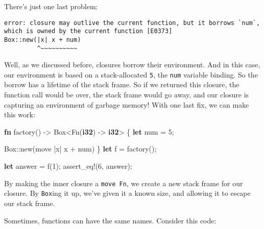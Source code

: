 \documentclass[a4paper,]{book}
\newenvironment{Shaded}{\begin{snugshade}}{\end{snugshade}}
\newcommand{\KeywordTok}[1]{\textcolor[rgb]{0.13,0.29,0.53}{\textbf{{#1}}}}
\newcommand{\DecValTok}[1]{\textcolor[rgb]{0.00,0.00,0.81}{{#1}}}
\newcommand{\OtherTok}[1]{\textcolor[rgb]{0.56,0.35,0.01}{{#1}}}
\newcommand{\NormalTok}[1]{{#1}}
\begin{document}
There's just one last problem:

\begin{verbatim}
error: closure may outlive the current function, but it borrows `num`,
which is owned by the current function [E0373]
Box::new(|x| x + num)
         ^~~~~~~~~~~
\end{verbatim}

Well, as we discussed before, closures borrow their environment. And in
this case, our environment is based on a stack-allocated \texttt{5}, the
\texttt{num} variable binding. So the borrow has a lifetime of the stack
frame. So if we returned this closure, the function call would be over,
the stack frame would go away, and our closure is capturing an
environment of garbage memory! With one last fix, we can make this work:

\begin{Shaded}
\begin{Highlighting}[]
\KeywordTok{fn} \NormalTok{factory() -> Box<Fn(}\KeywordTok{i32}\NormalTok{) -> }\KeywordTok{i32}\NormalTok{> \{}
    \KeywordTok{let} \NormalTok{num = }\DecValTok{5}\NormalTok{;}

    \NormalTok{Box::new(move |x| x + num)}
\NormalTok{\}}
\KeywordTok{let} \NormalTok{f = factory();}

\KeywordTok{let} \NormalTok{answer = f(}\DecValTok{1}\NormalTok{);}
\OtherTok{assert_eq!}\NormalTok{(}\DecValTok{6}\NormalTok{, answer);}
\end{Highlighting}
\end{Shaded}

By making the inner closure a \texttt{move\ Fn}, we create a new stack
frame for our closure. By \texttt{Box}ing it up, we've given it a known
size, and allowing it to escape our stack frame.


Sometimes, functions can have the same names. Consider this code:
\end{document}
